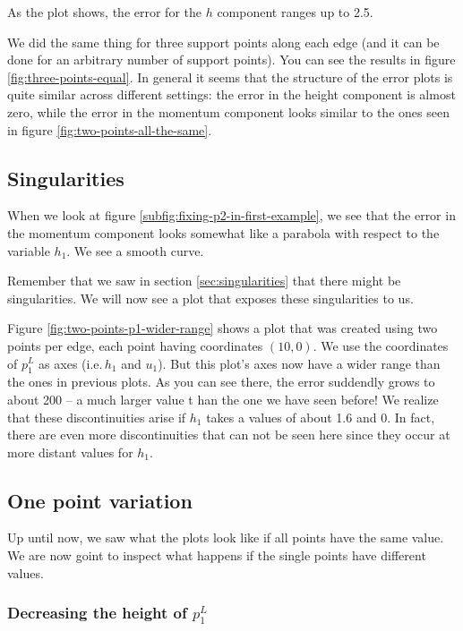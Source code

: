 \documentclass{article}
\begin{document}
As the plot shows, the error for the $h$ component ranges up to 2.5.

We did the same thing for three support points along each edge (and it can be done for an arbitrary number of support points). You can see the results in figure \ref{fig:three-points-equal}. In general it seems that the structure of the error plots is quite similar across different settings: the error in the height component is almost zero, while the error in the momentum component looks similar to the ones seen in figure \ref{fig:two-points-all-the-same}.



\subsection{Singularities}
\label{sec:plots-discontinuities}

When we look at figure \ref{subfig:fixing-p2-in-first-example}, we see that the error in the momentum component looks somewhat like a parabola with respect to the variable $h_1$. We see a smooth curve.

Remember that we saw in section \ref{sec:singularities} that there might be singularities. We will now see a plot that exposes these singularities to us.



Figure \ref{fig:two-points-p1-wider-range} shows a plot that was created using two points per edge, each point having coordinates $(10,0)$. We use the coordinates of $p_1^L$ as axes (i.e.\,$h_1$ and $u_1$). But this plot's axes now have a wider range than the ones in previous plots. As you can see there, the error suddendly grows to about 200 -- a much larger value t han the one we have seen before! We realize that these discontinuities arise if $h_1$ takes a values of about 1.6 and 0. In fact, there are even more discontinuities that can not be seen here since they occur at more distant values for $h_1$.

\subsection{One point variation}
\label{sec:one-point-variation}

Up until now, we saw what the plots look like if all points have the same value. We are now goint to inspect what happens if the single points have different values.

\subsubsection{Decreasing the height of $p_1^L$}
\label{sec:decreasing-height-p1}
\end{document}
